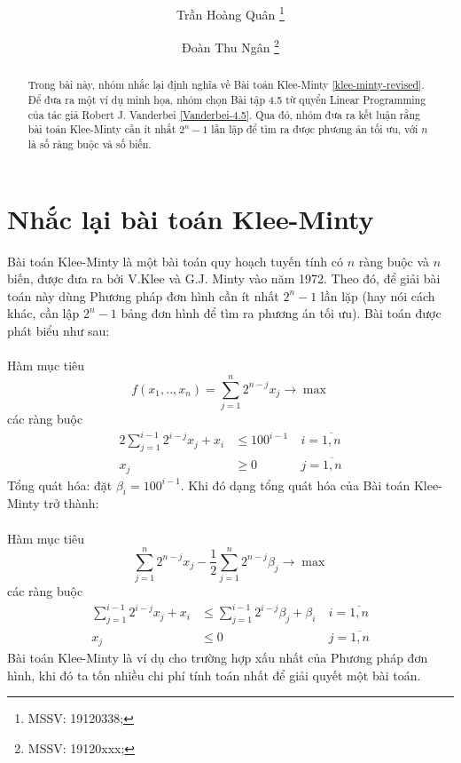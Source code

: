 \documentclass[12pt]{article}
\title{\textbf{\reportname}}
\author{Trần Hoàng Quân%
  \thanks{MSSV: 19120338;}}
\affil{Trường Đại học Khoa học Tự nhiên, ĐHQG-HCM}
\author{Đoàn Thu Ngân%
  \thanks{MSSV: 19120xxx;}}
\affil{Trường Đại học Khoa học Tự nhiên, ĐHQG-HCM}
\begin{document}
\maketitle

\begin{abstract}
Trong bài này, nhóm nhắc lại định nghĩa về Bài toán Klee-Minty \ref{klee-minty-revised}. Để đưa ra một ví dụ minh họa, nhóm chọn Bài tập 4.5 từ quyển Linear Programming của tác giả Robert J. Vanderbei \ref{Vanderbei-4.5}. Qua đó, nhóm đưa ra kết luận rằng bài toán Klee-Minty cần ít nhất $2^n - 1$ lần lặp để tìm ra được phương án tối ưu, với $n$ là số ràng buộc và số biến.
\end{abstract}

\section{Nhắc lại bài toán Klee-Minty}\label{klee-minty-revised}
Bài toán Klee-Minty là một bài toán quy hoạch tuyến tính có $n$ ràng buộc và $n$ biến, được đưa ra bởi V.Klee và G.J. Minty vào năm 1972\cite{Vanderbei2020}. Theo đó, để giải bài toán này dùng Phương pháp đơn hình cần ít nhất $2^{n} - 1$ lần lặp (hay nói cách khác, cần lập $2^{n} - 1$ bảng đơn hình để tìm ra phương án tối ưu). Bài toán được phát biểu như sau:\\\\
Hàm mục tiêu
$$
f(x_1, .., x_n) = \sum_{j = 1}^n 2^{n - j}x_j \rightarrow \max
$$
các ràng buộc
\begin{equation*}
\begin{aligned}
2\sum_{j = 1}^{i - 1} 2^{i - j}x_j + x_i &\leq 100^{i - 1}\ &i = \overline{1, n}\\
x_j &\geq 0\ &j = \overline{1, n}
\end{aligned}
\end{equation*}
Tổng quát hóa: đặt $\beta_i = 100^{i - 1}$. Khi đó dạng tổng quát hóa của Bài toán Klee-Minty trở thành:\\\\
Hàm mục tiêu
$$
\sum_{j = 1}^n 2^{n - j}x_j - \frac{1}{2}\sum_{j = 1}^{n} 2^{n - j}\beta_j \rightarrow \max
$$
các ràng buộc
\begin{equation*}
\begin{aligned}
\sum_{j = 1}^{i - 1} 2^{i - j} x_j + x_i &\leq \sum_{j = 1}^{i - 1} 2^{i - j} \beta_j + \beta_i\ &i = \overline{1, n}\\
x_j &\leq 0\ &j = \overline{1, n}
\end{aligned}
\end{equation*}
Bài toán Klee-Minty là ví dụ cho trường hợp xấu nhất của Phương pháp đơn hình, khi đó ta tốn nhiều chi phí tính toán nhất để giải quyết một bài toán.
\end{document}
